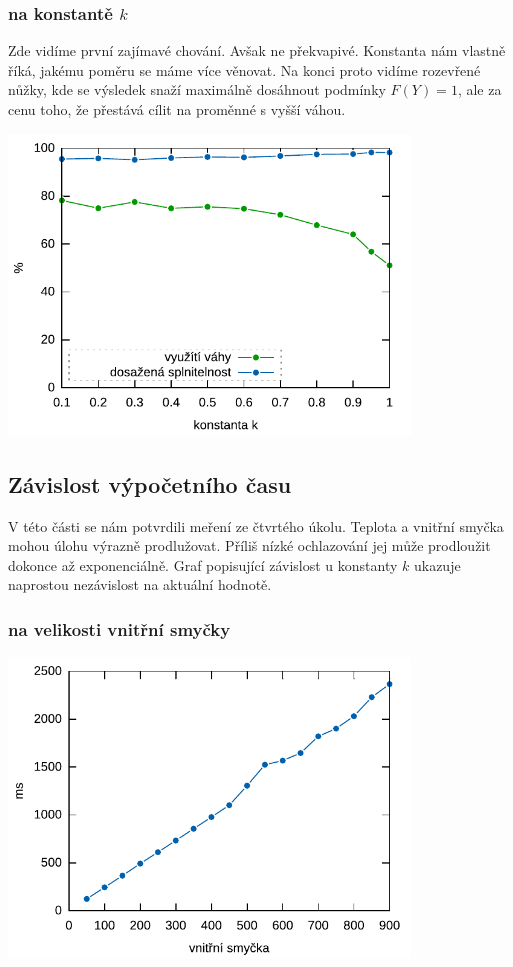 \documentclass[a4paper,10pt]{article}
\begin{document}
\subsubsection*{na konstantě $k$}
Zde vidíme první zajímavé chování. Avšak ne překvapivé. Konstanta nám vlastně říká, jakému poměru se máme více věnovat.
Na konci proto vidíme rozevřené nůžky, kde se výsledek snaží maximálně dosáhnout podmínky $F(Y)=1$, ale za cenu toho,
že přestává cílit na proměnné s vyšší váhou.
\begin{center}
\includegraphics[width=0.8\textwidth]{k.pdf}
\end{center}

\subsection*{Závislost výpočetního času}

V této části se nám potvrdili meření ze čtvrtého úkolu. Teplota a vnitřní smyčka mohou úlohu
výrazně prodlužovat. Příliš nízké ochlazování jej může prodloužit dokonce až exponenciálně.
Graf popisující závislost u konstanty $k$ ukazuje naprostou nezávislost na aktuální hodnotě.

\subsubsection*{na velikosti vnitřní smyčky}
\begin{center}
\includegraphics[width=0.8\textwidth]{inner_loop_time.pdf}
\end{center}
\end{document}
